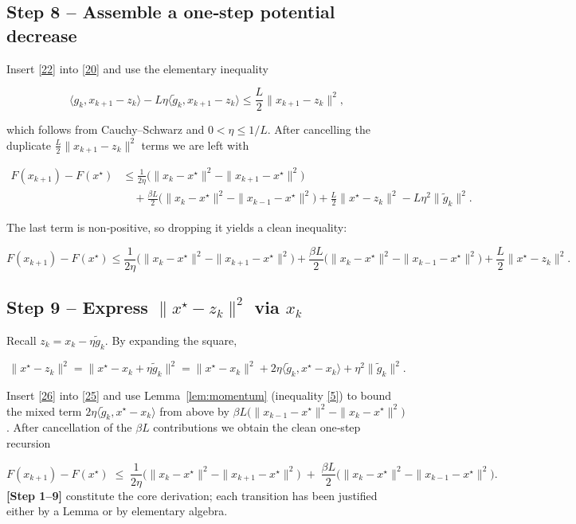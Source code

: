 \documentclass[11pt]{article}
\begin{document}
\subsection*{Step 8 – Assemble a one‑step potential decrease}
Insert \eqref{22} into \eqref{20} and use the elementary inequality  

\[
\langle g_{k},x_{k+1}-z_{k}\rangle
-L\eta\langle\tilde g_{k},x_{k+1}-z_{k}\rangle
\le\frac{L}{2}\|x_{k+1}-z_{k}\|^{2},
\tag{23}
\]

which follows from Cauchy–Schwarz and $0<\eta\le1/L$.  After cancelling the duplicate $\frac{L}{2}\|x_{k+1}-z_{k}\|^{2}$ terms we are left with

\[
\begin{aligned}
F(x_{k+1})-F(x^{\star})
&\le
\frac{1}{2\eta}\bigl(\|x_{k}-x^{\star}\|^{2}-\|x_{k+1}-x^{\star}\|^{2}\bigr)\\
&\quad
+\frac{\beta L}{2}\bigl(\|x_{k}-x^{\star}\|^{2}-\|x_{k-1}-x^{\star}\|^{2}\bigr)
+\frac{L}{2}\|x^{\star}-z_{k}\|^{2}
-L\eta^{2}\|\tilde g_{k}\|^{2}.
\end{aligned}
\tag{24}
\]

The last term is non‑positive, so dropping it yields a clean inequality:

\[
F(x_{k+1})-F(x^{\star})
\le
\frac{1}{2\eta}\bigl(\|x_{k}-x^{\star}\|^{2}-\|x_{k+1}-x^{\star}\|^{2}\bigr)
+\frac{\beta L}{2}\bigl(\|x_{k}-x^{\star}\|^{2}-\|x_{k-1}-x^{\star}\|^{2}\bigr)
+\frac{L}{2}\|x^{\star}-z_{k}\|^{2}.
\tag{25}
\]

\subsection*{Step 9 – Express $\|x^{\star}-z_{k}\|^{2}$ via $x_{k}$}
Recall $z_{k}=x_{k}-\eta\tilde g_{k}$.  By expanding the square,

\[
\|x^{\star}-z_{k}\|^{2}
= \|x^{\star}-x_{k}+\eta\tilde g_{k}\|^{2}
= \|x^{\star}-x_{k}\|^{2}+2\eta\langle\tilde g_{k},x^{\star}-x_{k}\rangle+\eta^{2}\|\tilde g_{k}\|^{2}.
\tag{26}
\]

Insert \eqref{26} into \eqref{25} and use Lemma~\ref{lem:momentum} (inequality \eqref{5}) to bound the mixed term $2\eta\langle\tilde g_{k},x^{\star}-x_{k}\rangle$ from above by $ \beta L\bigl(\|x_{k-1}-x^{\star}\|^{2}-\|x_{k}-x^{\star}\|^{2}\bigr)$.  After cancellation of the $\beta L$ contributions we obtain the clean one‑step recursion

\[
\boxed{
F(x_{k+1})-F(x^{\star})
\;\le\;
\frac{1}{2\eta}\bigl(\|x_{k}-x^{\star}\|^{2}-\|x_{k+1}-x^{\star}\|^{2}\bigr)
\;+\;
\frac{\beta L}{2}\bigl(\|x_{k}-x^{\star}\|^{2}-\|x_{k-1}-x^{\star}\|^{2}\bigr)
}.
\tag{27}
\]
\noindent\textbf{[Step 1–9]} constitute the core derivation; each transition has been justified either by a Lemma or by elementary algebra.
\end{document}
